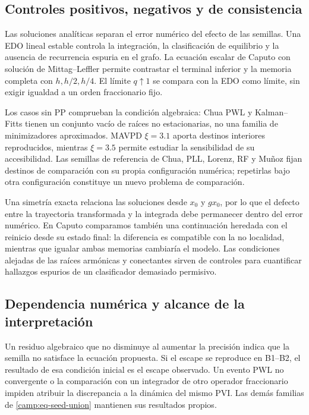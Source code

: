 \subsection{Controles positivos, negativos y de consistencia}
\label{camp:controls}

Las soluciones analíticas separan el error numérico del efecto de las
semillas. Una EDO lineal estable controla la integración, la clasificación
de equilibrio y la ausencia de recurrencia espuria en el grafo. La ecuación
escalar de Caputo con solución de Mittag--Leffler permite contrastar el
terminal inferior y la memoria completa con \(h,h/2,h/4\). El límite
\(q\uparrow1\) se compara con la EDO como límite, sin exigir igualdad a
un orden fraccionario fijo.

Los casos sin PP comprueban la condición algebraica: Chua PWL y
Kalman--Fitts tienen un conjunto vacío de raíces no estacionarias, no una
familia de minimizadores aproximados. MAVPD \(\xi=3.1\) aporta destinos
interiores reproducidos, mientras \(\xi=3.5\) permite estudiar la
sensibilidad de su accesibilidad. Las semillas de referencia de Chua, PLL,
Lorenz, RF y Muñoz fijan destinos de comparación con su propia
configuración numérica; repetirlas bajo otra configuración constituye un
nuevo problema de comparación.

Una simetría exacta relaciona las soluciones desde \(x_0\) y \(gx_0\),
por lo que el defecto entre la trayectoria transformada y la integrada
debe permanecer dentro del error numérico. En Caputo comparamos también
una continuación heredada con el reinicio desde su estado final: la
diferencia es compatible con la no localidad, mientras que igualar ambas
memorias cambiaría el modelo. Las condiciones alejadas de las raíces
armónicas y conectantes sirven de controles para cuantificar hallazgos
espurios de un clasificador demasiado permisivo.

\subsection{Dependencia numérica y alcance de la interpretación}
\label{camp:decision-rules}

Un residuo algebraico que no disminuye al aumentar la precisión indica que
la semilla no satisface la ecuación propuesta. Si el escape se reproduce en
B1--B2, el resultado de esa condición inicial es el escape observado. Un
evento PWL no convergente o la comparación con un integrador de otro operador
fraccionario impiden atribuir la discrepancia a la dinámica del mismo PVI.
Las demás familias de \cref{camp:eq-seed-union} mantienen sus resultados
propios.

